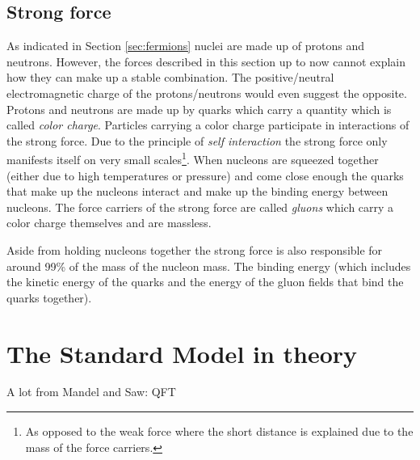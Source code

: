 \subsection*{Strong force}
As indicated in Section \ref{sec:fermions} nuclei are made up of protons and neutrons. However, the forces described in this section up to now cannot explain how they can make up a stable combination. The positive/neutral electromagnetic charge of the protons/neutrons would even suggest the opposite. Protons and neutrons are made up by quarks which carry a quantity which is called \textit{color charge}. Particles carrying a color charge participate in interactions of the strong force. Due to the principle of \textit{self interaction} the strong force only manifests itself on very small scales\footnote{As opposed to the weak force where the short distance is explained due to the mass of the force carriers.}. When nucleons are squeezed together (either due to high temperatures or pressure) and come close enough the quarks that make up the nucleons interact and make up the binding energy between nucleons.
The force carriers of the strong force are called \textit{gluons} which carry a color charge themselves and are massless.

Aside from holding nucleons together the strong force is also responsible for around 99\% of the mass of the nucleon mass. The binding energy (which includes the kinetic energy of the quarks and the energy of the gluon fields that bind the quarks together).

\section{The Standard Model in theory}
A lot from Mandel and Saw: QFT

